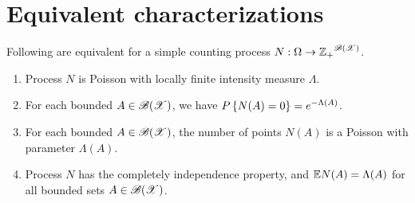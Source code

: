 \documentclass[letterpaper,10pt,english]{article}
\begin{document}
\section{Equivalent characterizations}
\begin{thm}[Equivalences] 
\label{thm:equiv}
Following are equivalent for a simple counting process $N: \Omega \to {\mathbb{Z}_+}^{\mathscr{B}(\mathscr{X})}$. 
\begin{enumerate}[i\_]
\item Process $N$ is Poisson with locally finite intensity measure $\Lambda$. 
\item For each bounded $A \in \mathscr{B}(\mathscr{X})$, we have $P\left\{N(A) = 0\right\} = e^{-\Lambda(A)}$. 
\item %
For each bounded $A \in \mathscr{B}(\mathscr{X})$,  the number of points $N(A)$ is a Poisson with parameter $\Lambda(A)$. 
\item Process $N$ has the completely independence property, and $\mathbb{E} N(A) = \Lambda(A)$ for all bounded sets $A \in \mathscr{B}(\mathscr{X})$. 
\end{enumerate}
\end{thm}
\end{document}

